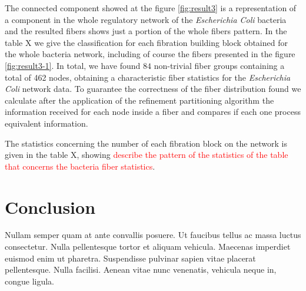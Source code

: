 \documentclass[12pt]{diazessay} %
\begin{document}
The connected component showed at the figure \ref{fig:result3} is a representation of a component in the whole regulatory network of the \textit{Escherichia Coli} bacteria and the resulted fibers shows just a portion of the whole fibers pattern. In the table X we give the classification for each fibration building block obtained for the whole bacteria network, including of course the fibers presented in the figure \ref{fig:result3-1}. In total, we have found $84$ non-trivial fiber groups containing a total of 462 nodes, obtaining a characteristic fiber statistics for the \textit{Escherichia Coli} network data. To guarantee the correctness of the fiber distribution found we calculate after the application of the refinement partitioning algorithm the information received for each node inside a fiber and compares if each one process equivalent information.

The statistics concerning the number of each fibration block on the network is given in the table X, showing \textcolor{red}{describe the pattern of the statistics of the table that concerns the bacteria fiber statistics}.


\section{Conclusion}

Nullam semper quam at ante convallis posuere. Ut faucibus tellus ac massa luctus consectetur. Nulla pellentesque tortor et aliquam vehicula. Maecenas imperdiet euismod enim ut pharetra. Suspendisse pulvinar sapien vitae placerat pellentesque. Nulla facilisi. Aenean vitae nunc venenatis, vehicula neque in, congue ligula.







\end{document}
